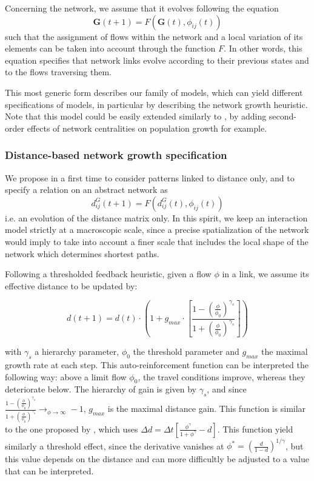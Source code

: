 \documentclass[11pt]{article}
\begin{document}
Concerning the network, we assume that it evolves following the equation
\begin{equation}
\label{eq:nwgengrowth}
\mathbf{G}(t + 1) = F(\mathbf{G}(t),\phi_{ij}(t))
\end{equation}
such that the assignment of flows within the network and a local variation of its elements can be taken into account through the function $F$. In other words, this equation specifies that network links evolve according to their previous states and to the flows traversing them.

This most generic form describes our family of models, which can yield different specifications of models, in particular by describing the network growth heuristic. Note that this model could be easily extended similarly to \cite{raimbault2018indirect}, by adding second-order effects of network centralities on population growth for example.

\subsubsection{Distance-based network growth specification}

We propose in a first time to consider patterns linked to distance only, and to specify a relation on an abstract network as
\begin{equation}
d^G_{ij}(t+1) = F(d^G_{ij}(t),\phi_{ij}(t))
\end{equation}
i.e. an evolution of the distance matrix only. In this spirit, we keep an interaction model strictly at a macroscopic scale, since a precise spatialization of the network would imply to take into account a finer scale that includes the local shape of the network which determines shortest paths.


Following a thresholded feedback heuristic, given a flow $\phi$ in a link, we assume its effective distance to be updated by:

\begin{equation}
\label{eq:nwthresholdgrowth}
d(t+1) = d(t)\cdot \left( 1 + g_{max} \cdot \left[\frac{1 - \left(\frac{\phi}{\phi_0}\right)^{\gamma_s}}{1 + \left(\frac{\phi}{\phi_0}\right)^{\gamma_s}}\right]\right)
\end{equation}

with $\gamma_s$ a hierarchy parameter, $\phi_0$ the threshold parameter and $g_{max}$ the maximal growth rate at each step. This auto-reinforcement function can be interpreted the following way: above a limit flow $\phi_0$, the travel conditions improve, whereas they deteriorate below. The hierarchy of gain is given by $\gamma_s$, and since $\frac{1 - \left(\frac{\phi}{\phi_0}\right)^{\gamma_s}}{1 + \left(\frac{\phi}{\phi_0}\right)^{\gamma_s}} \rightarrow_{\phi\rightarrow \infty} -1$, $g_{max}$ is the maximal distance gain. This function is similar to the one proposed by \cite{tero2007mathematical}, which uses $\Delta d = \Delta t \left[ \frac{\phi^\gamma}{1 + \phi^\gamma} - d\right]$. This function yield similarly a threshold effect, since the derivative vanishes at $\phi^{\ast} = \left(\frac{d}{1 - d}\right)^{1/\gamma}$, but this value depends on the distance and can more difficultly be adjusted to a value that can be interpreted.
\end{document}
